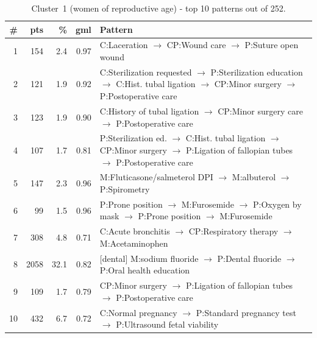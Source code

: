 \begin{table}[H]
\centering
\footnotesize
\renewcommand{\arraystretch}{1.2}
\begin{tabular}{@{}r r r r p{10.5cm}@{}}
\toprule
\textbf{\#} & \textbf{pts} & \textbf{\%} & \textbf{gml} & \textbf{Pattern} \\
\midrule
1  &  154 &  2.4 & 0.97 & C:Laceration $\to$ CP:Wound care $\to$ P:Suture open wound \\
2  &  121 &  1.9 & 0.92 & C:Sterilization requested $\to$ P:Sterilization education $\to$ C:Hist. tubal ligation $\to$ CP:Minor surgery $\to$ P:Postoperative care \\
3  &  123 &  1.9 & 0.90 & C:History of tubal ligation $\to$ CP:Minor surgery care $\to$ P:Postoperative care \\
4  &  107 &  1.7 & 0.81 & P:Sterilization ed. $\to$ C:Hist. tubal ligation $\to$ CP:Minor surgery $\to$ P:Ligation of fallopian tubes $\to$ P:Postoperative care \\
5  &  147 &  2.3 & 0.96 & M:Fluticasone/salmeterol DPI $\to$ M:albuterol $\to$ P:Spirometry \\
6  &   99 &  1.5 & 0.96 & P:Prone position $\to$ M:Furosemide $\to$ P:Oxygen by mask $\to$ P:Prone position $\to$ M:Furosemide \\
7  &  308 &  4.8 & 0.71 & C:Acute bronchitis $\to$ CP:Respiratory therapy $\to$ M:Acetaminophen \\
8  & 2058 & 32.1 & 0.82 & [dental] M:sodium fluoride $\to$ P:Dental fluoride $\to$ P:Oral health education \\
9  &  109 &  1.7 & 0.79 & CP:Minor surgery $\to$ P:Ligation of fallopian tubes $\to$ P:Postoperative care \\
10 &  432 &  6.7 & 0.72 & C:Normal pregnancy $\to$ P:Standard pregnancy test $\to$ P:Ultrasound fetal viability \\
\bottomrule
\end{tabular}
\caption{Cluster~1 (women of reproductive age) - top 10 patterns out of 252.}
\label{tab:ch6_seq_c1}
\end{table}

